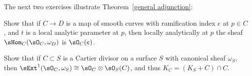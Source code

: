 The next two exercises illustrate Theorem~\ref{general adjunction}:

\begin{exercise}\label{codimension0}
Show that if $C\to D$ is a map of smooth curves with ramification index $e$ at $p\in C$, and $t$ is a local
analytic parameter at $p$, then 
locally analytically at $p$ the sheaf $\sHom_C(\sO_C, \omega_D)$ is $\sO_C(e)$.
\end{exercise}

\begin{exercise}\label{codimension1}
 Show that if $C\subset S$ is a Cartier divisor on a surface $S$ with canonical sheaf $\omega_S$, 
 then $\sExt^1(\sO_C, \omega_S) \cong \sO_C\otimes \sO_S(C)$, and thus $K_C = (K_S+C)\cap C$.
\end{exercise}




